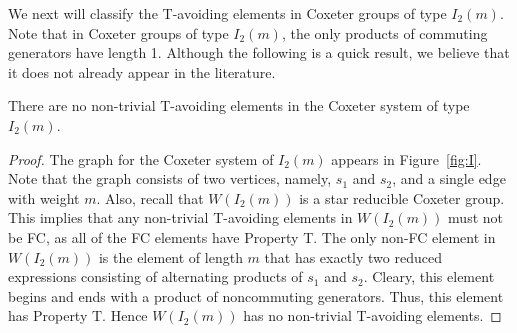 We next will classify the T-avoiding elements in Coxeter groups of type $I_2(m)$. Note that in Coxeter groups of type $I_2(m)$, the only products of commuting generators have length 1. Although the following is a quick result, we believe that it does not already appear in the literature.
\begin{theorem}
There are no non-trivial T-avoiding elements in the Coxeter system of type $I_2(m)$.
\begin{proof}
	The graph for the Coxeter system of $I_2(m)$ appears in Figure~\ref{fig:I}. Note that the graph consists of two vertices, namely, $s_1$ and $s_2$, and a single edge with weight $m$. Also, recall that $W(I_2(m))$ is a star reducible Coxeter group. This implies that any non-trivial T-avoiding elements in $W(I_2(m))$ must not be FC, as all of the FC elements have Property T. The only non-FC element in $W(I_2(m))$ is the element of length $m$ that has exactly two reduced expressions consisting of alternating products of $s_1$ and $s_2$. Cleary, this element begins and ends with a product of noncommuting generators. Thus, this element has Property T. Hence $W(I_2(m))$ has no non-trivial T-avoiding elements. 
\end{proof}	
\end{theorem}
 



